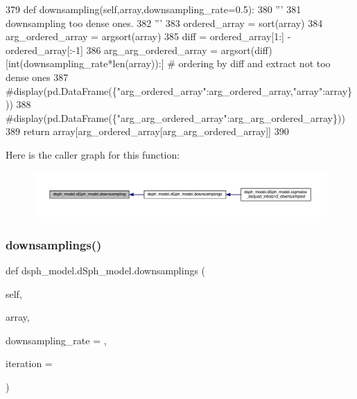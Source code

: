 \begin{DoxyCode}
379     \textcolor{keyword}{def }downsampling(self,array,downsampling\_rate=0.5):
380         \textcolor{stringliteral}{'''}
381 \textcolor{stringliteral}{        downsampling too dense ones.}
382 \textcolor{stringliteral}{        '''}
383         ordered\_array = sort(array)
384         arg\_ordered\_array = argsort(array)
385         diff = ordered\_array[1:] - ordered\_array[:-1]
386         arg\_arg\_ordered\_array = argsort(diff)[int(downsampling\_rate*len(array)):] \textcolor{comment}{# ordering by diff and
       extract not too dense ones}
387         \textcolor{comment}{#display(pd.DataFrame(\{"arg\_ordered\_array":arg\_ordered\_array,"array":array\}))}
388         \textcolor{comment}{#display(pd.DataFrame(\{"arg\_arg\_ordered\_array":arg\_arg\_ordered\_array\}))}
389         \textcolor{keywordflow}{return} array[arg\_ordered\_array[arg\_arg\_ordered\_array]]
390     
\end{DoxyCode}
Here is the caller graph for this function\+:\nopagebreak
\begin{figure}[H]
\begin{center}
\leavevmode
\includegraphics[width=350pt]{d0/d25/classdsph__model_1_1dSph__model_a4d9e1c397b4ae379c680bc7453845781_icgraph}
\end{center}
\end{figure}
\mbox{\label{classdsph__model_1_1dSph__model_aa362ce682d90de77e755374efa153cf7}} 
\subsubsection{\texorpdfstring{downsamplings()}{downsamplings()}}
{\footnotesize\ttfamily def dsph\+\_\+model.\+d\+Sph\+\_\+model.\+downsamplings (\begin{DoxyParamCaption}\item[{}]{self,  }\item[{}]{array,  }\item[{}]{downsampling\+\_\+rate = {},  }\item[{}]{iteration = {} }\end{DoxyParamCaption})}



